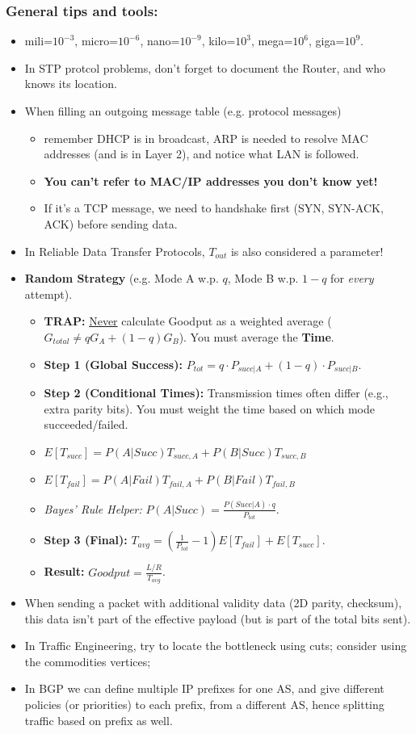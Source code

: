 \subsubsection{General tips and tools:}
\begin{itemize}
	\item mili=$10^{-3}$, micro=$10^{-6}$, nano=$10^{-9}$, kilo=$10^{3}$, mega=$10^{6}$, giga=$10^{9}$.
	\item In STP protcol problems, don't forget to document the Router, and who knows its location.
	\item When filling an outgoing message table (e.g. protocol messages)
	\begin{itemize}
		\item remember DHCP is in broadcast, ARP is needed to resolve MAC addresses (and is in Layer 2), and notice what LAN is followed.
		\item \textbf{You can't refer to MAC/IP addresses you don't know yet!}
		\item If it's a TCP message, we need to handshake first (SYN, SYN-ACK, ACK) before sending data.
	\end{itemize}
	\item In Reliable Data Transfer Protocols, $T_{out}$ is also considered a parameter!
	\item \textbf{Random Strategy} (e.g. Mode A w.p. $q$, Mode B w.p. $1-q$ for \textit{every} attempt).
		\begin{itemize}
			\item \textbf{TRAP:} \underline{Never} calculate Goodput as a weighted average ($G_{total} \neq q G_A + (1-q) G_B$). You must average the \textbf{Time}.
			\item \textbf{Step 1 (Global Success):} $P_{tot} = q \cdot P_{succ|A} + (1-q) \cdot P_{succ|B}$.
			\item \textbf{Step 2 (Conditional Times):} Transmission times often differ (e.g., extra parity bits). You must weight the time based on which mode succeeded/failed.
			\item[] $E[T_{succ}] = P(A|Succ)T_{succ,A} + P(B|Succ)T_{succ,B}$
			\item[] $E[T_{fail}] = P(A|Fail)T_{fail,A} + P(B|Fail)T_{fail,B}$
			\item[] \textit{Bayes' Rule Helper:} $P(A|Succ) = \frac{P(Succ|A) \cdot q}{P_{tot}}$.
			\item \textbf{Step 3 (Final):} $T_{avg} = \left(\frac{1}{P_{tot}} - 1\right) E[T_{fail}] + E[T_{succ}]$.
			\item \textbf{Result:} $Goodput = \frac{L/R}{T_{avg}}$.
		\end{itemize}
	\item When sending a packet with additional validity data (2D parity, checksum), this data isn't part of the effective payload (but is part of the total bits sent).
	\item In Traffic Engineering, try to locate the bottleneck using cuts; consider using the commodities vertices;
	\item In BGP we can define multiple IP prefixes for one AS, and give different policies (or priorities) to each prefix, from a different AS, hence splitting traffic based on prefix as well.
\end{itemize}
